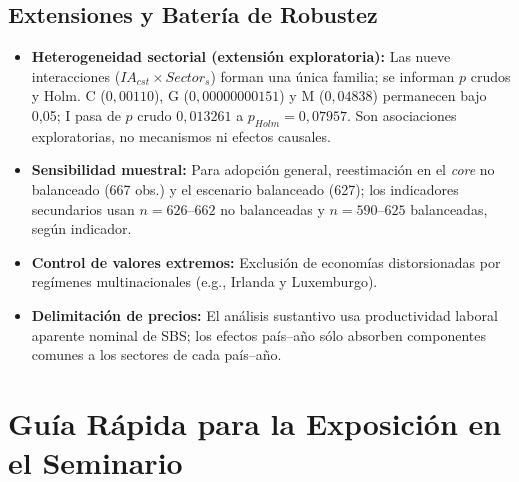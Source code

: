 \documentclass[12pt,a4paper]{article}
\begin{document}
\subsection{Extensiones y Batería de Robustez}
\begin{itemize}[leftmargin=*]
  \item \textbf{Heterogeneidad sectorial (extensión exploratoria):} Las nueve interacciones ($IA_{cst} \times Sector_s$) forman una única familia; se informan $p$ crudos y Holm. C ($0,00110$), G ($0,00000000151$) y M ($0,04838$) permanecen bajo 0,05; I pasa de $p$ crudo $0,013261$ a $p_{Holm}=0,07957$. Son asociaciones exploratorias, no mecanismos ni efectos causales.
  \item \textbf{Sensibilidad muestral:} Para adopción general, reestimación en el \textit{core} no balanceado (667 obs.) y el escenario balanceado (627); los indicadores secundarios usan $n=626\text{--}662$ no balanceadas y $n=590\text{--}625$ balanceadas, según indicador.
  \item \textbf{Control de valores extremos:} Exclusión de economías distorsionadas por regímenes multinacionales (e.g., Irlanda y Luxemburgo).
  \item \textbf{Delimitación de precios:} El análisis sustantivo usa productividad laboral aparente nominal de SBS; los efectos país--año sólo absorben componentes comunes a los sectores de cada país--año.
\end{itemize}

\section{Guía Rápida para la Exposición en el Seminario}
\end{document}
